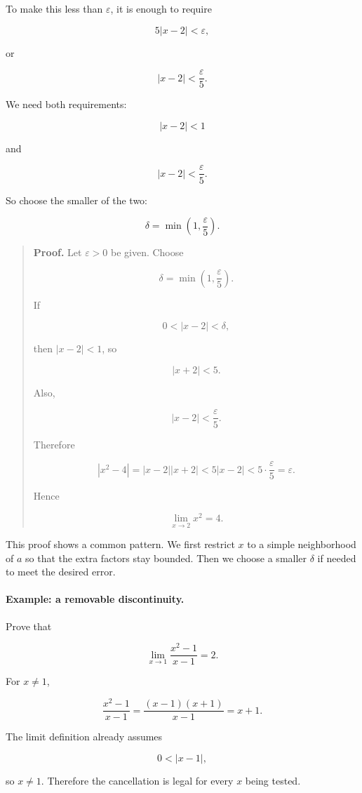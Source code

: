 To make this less than \(\varepsilon\), it is enough to require

\[
5|x-2|<\varepsilon,
\]

or

\[
|x-2|<\frac{\varepsilon}{5}.
\]

We need both requirements:

\[
|x-2|<1
\]

and

\[
|x-2|<\frac{\varepsilon}{5}.
\]

So choose the smaller of the two:

\[
\delta=\min\left(1,\frac{\varepsilon}{5}\right).
\]

\begin{quote}
\textbf{Proof.}
Let \(\varepsilon>0\) be given.  Choose

\[
\delta=\min\left(1,\frac{\varepsilon}{5}\right).
\]

If

\[
0<|x-2|<\delta,
\]

then \(|x-2|<1\), so

\[
|x+2|<5.
\]

Also,

\[
|x-2|<\frac{\varepsilon}{5}.
\]

Therefore

\[
|x^2-4|
=
|x-2||x+2|
<
5|x-2|
<
5\cdot \frac{\varepsilon}{5}
=
\varepsilon.
\]

Hence

\[
\lim_{x\to2}x^2=4.
\]
\end{quote}

This proof shows a common pattern.  We first restrict \(x\) to a simple neighborhood of \(a\) so that the extra factors stay bounded.  Then we choose a smaller \(\delta\) if needed to meet the desired error.

\paragraph{Example: a removable discontinuity.}
Prove that

\[
\lim_{x\to1}\frac{x^2-1}{x-1}=2.
\]

For \(x\neq1\),

\[
\frac{x^2-1}{x-1}
=
\frac{(x-1)(x+1)}{x-1}
=
x+1.
\]

The limit definition already assumes

\[
0<|x-1|,
\]

so \(x\neq1\).  Therefore the cancellation is legal for every \(x\) being tested.

